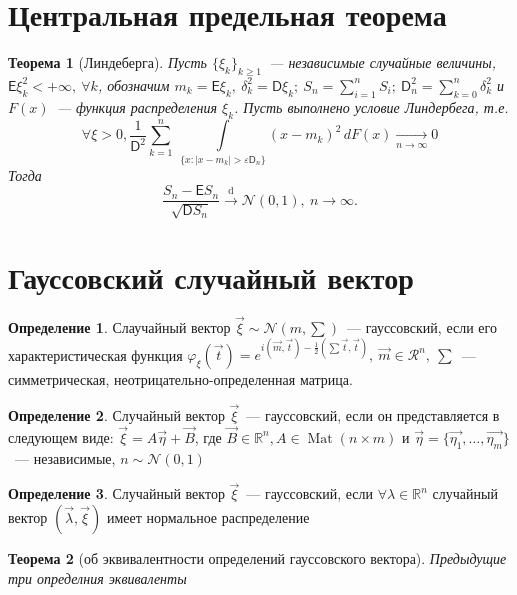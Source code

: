 \documentclass[11pt, a5paper]{article}
\DeclareMathOperator{\mat}{Mat}
\newtheorem{theorem}{Теорема}[section]
\theoremstyle{definition}\newtheorem{definition}{Определение}
\begin{document}
\section{Центральная предельная теорема}
	\begin{theorem}[Линдеберга]
	 Пусть $\{\xi_k\}_{k \geqslant 1}$~--- независимые случайные величины, $\mathsf{E} \xi_k^2 <+ \infty,~\forall k$, обозначим $m_k=\mathsf{E} \xi_k,~\delta_k^2=\mathsf{D} \xi_k;~S_n=\sum\limits_{i=1}^{n}S_i;~\mathsf{D}_n^2 = \sum\limits_{k=0}^{n}\delta_k^2$ и $F(x)$~--- функция распределения $\xi_k$. Пусть выполнено условие Линдербега, т.е.
	 $$\forall\xi>0,\frac{1}{\mathsf{D}^2}\sum\limits_{k=1}^{n}~ \int\limits_{\{x:\mid x-m_k\mid >\varepsilon \mathsf{D}_n\}} (x-m_k)^2\,dF(x) \xrightarrow[n \rightarrow \infty]{} 0 $$
	 Тогда  $$ \frac{S_n-\mathsf{E}S_n}{\sqrt{\mathsf{D}S_n}}\overset{\text{d}}{\longrightarrow} \mathcal{N} (0,1),~n \rightarrow \infty.$$
	\end{theorem}
	\section{Гауссовский случайный вектор}
	\begin{definition}
Слаучайный вектор $\vec{\xi}\sim \mathcal{N}(m,\sum)$~--- гауссовский, если его характеристическая функция $\varphi_\xi(\vec{t})=e^{i(\vec{m},\vec{t}) -\frac{1}{2}(\sum\vec{t},\vec{t})},~\vec{m} \in \mathcal{R}^n,~\sum$~--- симметрическая, неотрицательно-определенная матрица.
	\end{definition}
	\begin{definition}
Случайный вектор $\vec{\xi}$~--- гауссовский, если он представляется в следующем виде: $\vec{\xi} = A\vec{\eta} + \vec{B}$, где $\vec{B} \in \mathbb{R}^n,A \in \mat (n\times m)$ и $\vec{\eta} = \{\vec{\eta_1}, \ldots,\vec{\eta_m} \}$~--- независимые, $n \sim \mathcal{N}(0,1)$
	\end{definition}
	\begin{definition}
Случайный вектор $\vec{\xi}$~--- гауссовский, если $\forall \lambda \in \mathbb{R}^n$ случайный вектор $(\vec{\lambda}, \vec{\xi})$ имеет нормальное распределение
	\end{definition}
	\begin{theorem}[об эквивалентности определений гауссовского вектора]
		Предыдущие три определния эквиваленты
	\end{theorem}
\end{document}
